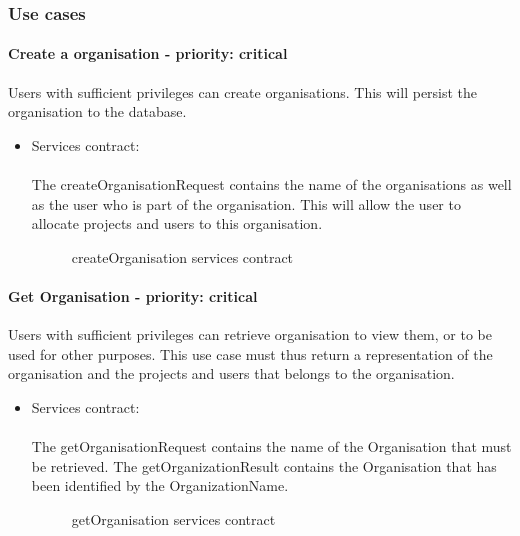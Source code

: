 \subsubsection{Use cases}

\paragraph{Create a organisation - priority: critical}
Users with sufficient privileges can create organisations. This will persist the organisation to the database.

\begin{itemize}
	\item Services contract:\\ \\
	The createOrganisationRequest contains the name of the organisations as well as the user who is part of the organisation. This will allow the user to allocate projects and users to this organisation.
	\begin{figure}[H]
    	\centering
    	\caption{createOrganisation services contract}
    	\label{fig:createOrganisation_services_contract}
   	\end{figure}
\end{itemize}

\paragraph{Get Organisation - priority: critical}
Users with sufficient privileges can retrieve organisation to view them, or to be used for other purposes. This use case must thus return a representation of the organisation and the projects and users that belongs to the organisation.
\begin{itemize}
	\item Services contract:\\ \\
	The getOrganisationRequest contains the name of the Organisation that must be retrieved. The getOrganizationResult contains the Organisation that has been identified by the OrganizationName.
	\begin{figure}[H]
    	\centering
    	\caption{getOrganisation services contract}
    	\label{fig:getOrganisation_services_contract}
   	\end{figure}
\end{itemize}

